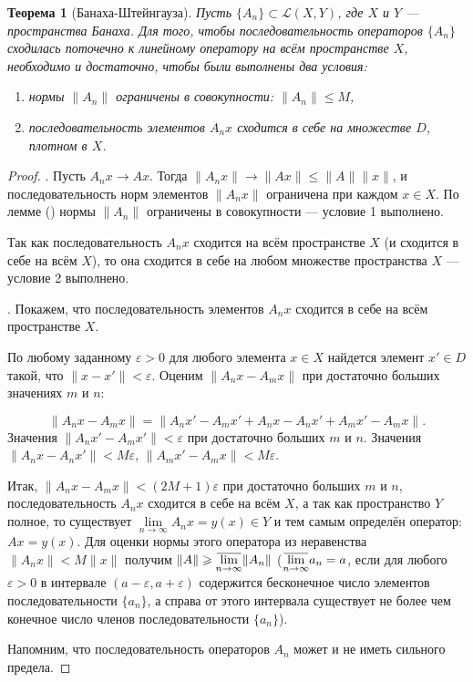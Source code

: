 \documentclass[12pt,a4paper,titlepage,oneside]{book}
\newcommand{\overbar}[1]{\mkern 1.5mu\overline{\mkern-1.5mu#1\mkern-1.5mu}\mkern 1.5mu}
\newcommand{\rom}[1]{\uppercase\expandafter{\romannumeral #1\relax}}
\theoremstyle{definition}
\theoremstyle{plain}
\newtheorem*{theorem}{Теорема}
\theoremstyle{break}
\theoremstyle{remark}
\theoremstyle{remark}
\theoremstyle{remark}
\theoremstyle{remark}
\theoremstyle{plain}
\theoremstyle{plain}
\begin{document}
\begin{theorem}[Банаха-Штейнгауза]
Пусть $\lbrace A_n\rbrace \subset \mathcal{L}(X,Y)$, где $X$ и $Y$ --- пространства Банаха. Для того, чтобы последовательность операторов $\lbrace A_n\rbrace$ сходилась поточечно к линейному оператору на всём пространстве $X$, необходимо и достаточно, чтобы были выполнены два условия:

\begin{enumerate}
\item нормы $\lVert A_n\rVert$ ограничены в совокупности: $\lVert A_n\rVert \leqslant M$,
\item последовательность элементов $A_n x$ сходится в себе на множестве $D$, плотном в $X$.
\end{enumerate}
\end{theorem}

\begin{proof}
. Пусть $A_n x \to A x$. Тогда $\lVert A_n x\rVert \to \lVert A x\rVert \leqslant \lVert A\rVert \lVert x\rVert$, и последовательность норм элементов $\lVert A_n x\rVert$ ограничена при каждом $x \in X$. По лемме (\rom{2}) нормы $\lVert A_n\rVert$ ограничены в совокупности --- условие 1 выполнено.

Так как последовательность $A_n x$ сходится на всём пространстве $X$ (и сходится в себе на всём $X$), то она сходится в себе на любом множестве пространства $X$ --- условие 2 выполнено.

. Покажем, что последовательность элементов $A_n x$ сходится в себе на всём пространстве $X$.

По любому заданному $\varepsilon > 0$ для любого элемента $x \in X$ найдется элемент $x' \in D$ такой, что $\lVert x - x'\rVert < \varepsilon$. Оценим $\lVert A_n x - A_m x\rVert$ при достаточно больших значениях $m$ и $n$:

$$\lVert A_n x - A_m x\rVert = \lVert A_n x' - A_m x' + A_n x - A_n x' + A_m x' - A_m x\rVert.$$
Значения $\lVert A_n x' - A_m x'\rVert < \varepsilon$ при достаточно больших $m$ и $n$.
Значения $\lVert A_n x - A_n x'\rVert < M\varepsilon$, $\lVert A_m x' - A_m x\rVert < M\varepsilon$.

Итак, $\lVert A_n x - A_m x\rVert < (2M +1)\varepsilon$ при достаточно больших $m$ и $n$, последовательность $A_n x$ сходится в себе на всём $X$, а так как пространство $Y$ полное, то существует $\lim\limits_{n \to \infty} A_n x = y(x) \in Y$ и тем самым определён оператор: $A x = y(x)$. Для оценки нормы этого оператора из неравенства $\lVert A_n x\rVert < M\lVert x\rVert$ получим $\lVert A\rVert \geqslant \overbar{\lim\limits_{n \to \infty}}\lVert A_n\rVert$ ($\overbar{\lim\limits_{n \to \infty}}a_n = a$, если для любого $\varepsilon > 0$ в интервале $(a-\varepsilon, a+\varepsilon)$ содержится бесконечное число элементов последовательности $\lbrace a_n\rbrace$, а справа от этого интервала существует не более чем конечное число членов последовательности $\lbrace a_n\rbrace$).

Напомним, что последовательность операторов $A_n$ может и не иметь сильного предела.
\end{proof}
\end{document}
